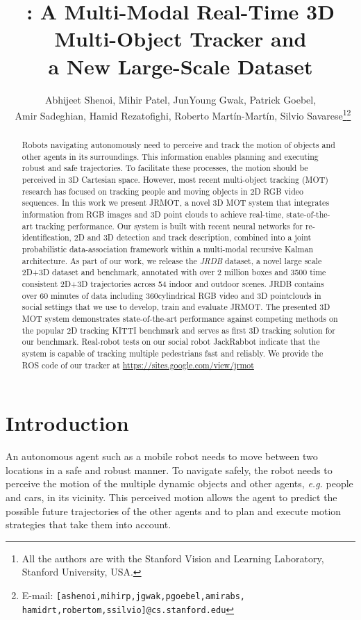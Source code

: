 \documentclass[letterpaper, 10 pt, conference]{ieeeconf}
\title{\LARGE \bf
\methodname: A Multi-Modal Real-Time 3D Multi-Object Tracker and \\a New Large-Scale Dataset
}
\author{Abhijeet Shenoi, Mihir Patel, JunYoung Gwak, Patrick Goebel, \\\ Amir Sadeghian, Hamid Rezatofighi, Roberto Mart\'in-Mart\'in, Silvio Savarese\thanks{All the authors are with the Stanford Vision and Learning Laboratory, Stanford University, USA.}\thanks{E-mail: {\tt\small[ashenoi,mihirp,jgwak,pgoebel,amirabs,
hamidrt,robertom,ssilvio]@cs.stanford.edu}}}
\newcommand{\jrdb}{JRDB\xspace}
\newcommand{\jackrabbot}{JackRabbot\xspace}
\newcommand{\methodname}{{JRMOT}\xspace}
\newcommand{\eg}{\emph{e.g.}\xspace}
\begin{document}
\maketitle
\thispagestyle{empty}
\pagestyle{empty}


\begin{abstract}
Robots navigating autonomously need to perceive and track the motion of objects and other agents in its surroundings.
This information enables planning and executing robust and safe trajectories.
To facilitate these processes, the motion should be perceived in 3D Cartesian space. However, most recent multi-object tracking (MOT) research has focused on tracking people and moving objects in 2D RGB video sequences.
In this work we present \methodname, a novel 3D MOT system that integrates information from RGB images and 3D point clouds to achieve real-time, state-of-the-art tracking performance.
Our system is built with recent neural networks for re-identification, 2D and 3D detection and track description, combined into a joint probabilistic data-association framework within a multi-modal recursive Kalman architecture. 
As part of our work, we release the \emph{\jrdb} dataset, a novel large scale 2D+3D dataset and benchmark, annotated with over 2 million boxes and 3500 time consistent 2D+3D trajectories across 54 indoor and outdoor scenes. 
\jrdb contains over 60 minutes of data including 360\degree cylindrical RGB video and 3D pointclouds in social settings that we use to develop, train and evaluate \methodname. 
The presented 3D MOT system demonstrates state-of-the-art performance against competing methods on the popular 2D tracking KITTI benchmark and serves as first 3D tracking solution for our benchmark. Real-robot tests on our social robot \jackrabbot indicate that the system is capable of tracking multiple pedestrians fast and reliably. We provide the ROS code of our tracker at \href{https://sites.google.com/view/jrmot}{https://sites.google.com/view/jrmot}
\end{abstract}


\section{Introduction}
\label{s:intro}

An autonomous agent such as a mobile robot needs to move between two locations in a safe and robust manner. 
To navigate safely, the robot needs to perceive the motion of the multiple dynamic objects and other agents, \eg people and cars, in its vicinity.
This perceived motion allows the agent to predict the possible future trajectories of the other agents and to plan and execute motion strategies that take them into account.
\end{document}
